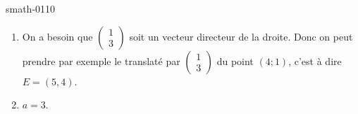 
\begin{corrige}{smath-0110}

    \begin{enumerate}
        \item
    On a besoin que \( \begin{pmatrix}
        1    \\ 
        3    
    \end{pmatrix}\) soit un vecteur directeur de la droite. Donc on peut prendre par exemple le translaté par \( \begin{pmatrix}
        1    \\ 
         3   
    \end{pmatrix}\) du point \( (4;1)\), c'est à dire \( E=(5,4)\).
        \item
            \( a=3\).

    \end{enumerate}

\end{corrige}
